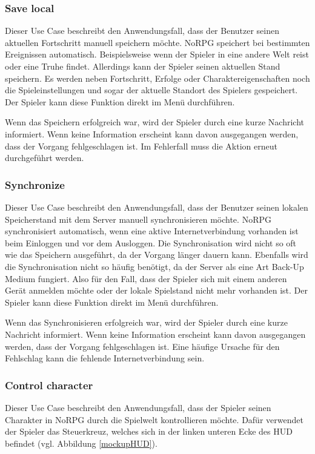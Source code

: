 		\subsubsection{Save local}
			Dieser Use Case beschreibt den Anwendungsfall, dass der Benutzer seinen aktuellen Fortschritt manuell speichern möchte. NoRPG speichert bei bestimmten Ereignissen automatisch. Beispielsweise wenn der Spieler in eine andere Welt reist oder eine Truhe findet. Allerdings kann der Spieler seinen aktuellen Stand speichern. Es werden neben Fortschritt, Erfolge oder Charaktereigenschaften noch die Spieleinstellungen und sogar der aktuelle Standort des Spielers gespeichert. Der Spieler kann diese Funktion direkt im Menü durchführen.
		
			Wenn das Speichern erfolgreich war, wird der Spieler durch eine kurze Nachricht informiert. Wenn keine Information erscheint kann davon ausgegangen werden, dass der Vorgang fehlgeschlagen ist. Im Fehlerfall muss die Aktion erneut durchgeführt werden.
		
		\subsubsection{Synchronize}
			Dieser Use Case beschreibt den Anwendungsfall, dass der Benutzer seinen lokalen Speicherstand mit dem Server manuell synchronisieren möchte. NoRPG synchronisiert automatisch, wenn eine aktive Internetverbindung vorhanden ist beim Einloggen und vor dem Ausloggen. Die Synchronisation wird nicht so oft wie das Speichern ausgeführt, da der Vorgang länger dauern kann. Ebenfalls wird die Synchronisation nicht so häufig benötigt, da der Server als eine Art Back-Up Medium fungiert. Also für den Fall, dass der Spieler sich mit einem anderen Gerät anmelden möchte oder der lokale Spielstand nicht mehr vorhanden ist. Der Spieler kann diese Funktion direkt im Menü durchführen.
	
			Wenn das Synchronisieren erfolgreich war, wird der Spieler durch eine kurze Nachricht informiert. Wenn keine Information erscheint kann davon ausgegangen werden, dass der Vorgang fehlgeschlagen ist. Eine häufige Ursache für den Fehlschlag kann die fehlende Internetverbindung sein.
		
		\subsubsection{Control character}
			Dieser Use Case beschreibt den Anwendungsfall, dass der Spieler seinen Charakter in NoRPG durch die Spielwelt kontrollieren möchte. Dafür verwendet der Spieler das Steuerkreuz, welches sich in der linken unteren Ecke des \ac{HUD} befindet (vgl. Abbildung \ref{mockupHUD}).
			
